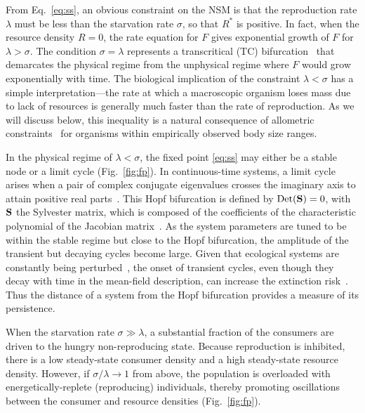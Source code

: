 \documentclass[11pt]{article}
\begin{document}
\begin{multicols}{2}
From Eq.~\eqref{eq:ss}, an obvious constraint on the NSM is that the reproduction rate $\lambda$ must be less than the starvation rate $\sigma$, so that $R^*$ is positive.  In fact, when the resource density $R=0$, the rate equation for $F$ gives exponential growth of $F$ for $\lambda>\sigma$. 
The condition $\sigma = \lambda$ represents a transcritical (TC) bifurcation~\cite{Strogatz:2008wo} that demarcates the physical regime from the unphysical regime where $F$ would grow exponentially with time.  
The biological implication of the constraint $\lambda<\sigma$ has a simple interpretation---the rate at which a macroscopic organism loses mass due to lack of resources is generally much faster than the rate of reproduction.  
As we will discuss below, this inequality is a natural consequence of allometric constraints~\cite{Kempes:2012hy} for organisms within empirically observed body size ranges.

In the physical regime of $\lambda<\sigma$, the fixed point \eqref{eq:ss} may either be a stable node or a limit cycle (Fig.~\ref{fig:fp}).  
In continuous-time systems, a limit cycle arises when a pair of complex conjugate eigenvalues crosses the imaginary axis to attain positive real parts~\cite{GuckHolmes}.  
This Hopf bifurcation is defined by ${\rm Det}({\bf S}) = 0$, with $\bf S$ the Sylvester matrix, which is composed of the coefficients of the characteristic polynomial of the Jacobian matrix~\cite{Gross:2004p2428}.  
As the system parameters are tuned to be within the stable regime but close to the Hopf bifurcation, the amplitude of the transient but decaying cycles become large.  
Given that ecological systems are constantly being perturbed~\cite{Hastings:2001jh}, the onset of transient cycles, even though they decay with time in the mean-field description, can increase the extinction risk~\cite{Neubert:1997wk,Caswell:2005eo,Neubert:2009td}.  
Thus the distance of a system from the Hopf bifurcation provides a measure of its persistence.

When the starvation rate $\sigma\gg\lambda$, a substantial fraction of the consumers are driven to the hungry non-reproducing state.  
Because reproduction is inhibited, there is a low steady-state consumer density and a high steady-state resource density.  
However, if $\sigma/\lambda\to 1$ from above, the population is overloaded with energetically-replete (reproducing) individuals, thereby promoting oscillations between the consumer and resource densities (Fig.~\ref{fig:fp}).


\end{multicols}
\end{document}
